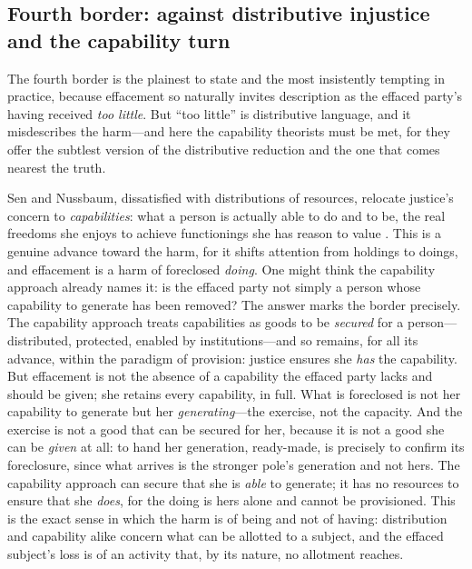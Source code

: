 \subsection{Fourth border: against distributive injustice and the capability turn}
\label{p18:sub:def-distributive}

The fourth border is the plainest to state and the most insistently tempting in practice, because effacement so naturally invites description as the effaced party's having received \emph{too little}. But ``too little'' is distributive language, and it misdescribes the harm---and here the capability theorists must be met, for they offer the subtlest version of the distributive reduction and the one that comes nearest the truth.

Sen and Nussbaum, dissatisfied with distributions of resources, relocate justice's concern to \emph{capabilities}: what a person is actually able to do and to be, the real freedoms she enjoys to achieve functionings she has reason to value \parencite{sen1999, nussbaum2000}. This is a genuine advance toward the harm, for it shifts attention from holdings to doings, and effacement is a harm of foreclosed \emph{doing}. One might think the capability approach already names it: is the effaced party not simply a person whose capability to generate has been removed? The answer marks the border precisely. The capability approach treats capabilities as goods to be \emph{secured} for a person---distributed, protected, enabled by institutions---and so remains, for all its advance, within the paradigm of provision: justice ensures she \emph{has} the capability. But effacement is not the absence of a capability the effaced party lacks and should be given; she retains every capability, in full. What is foreclosed is not her capability to generate but her \emph{generating}---the exercise, not the capacity. And the exercise is not a good that can be secured for her, because it is not a good she can be \emph{given} at all: to hand her generation, ready-made, is precisely to confirm its foreclosure, since what arrives is the stronger pole's generation and not hers. The capability approach can secure that she is \emph{able} to generate; it has no resources to ensure that she \emph{does}, for the doing is hers alone and cannot be provisioned. This is the exact sense in which the harm is of being and not of having: distribution and capability alike concern what can be allotted to a subject, and the effaced subject's loss is of an activity that, by its nature, no allotment reaches.

